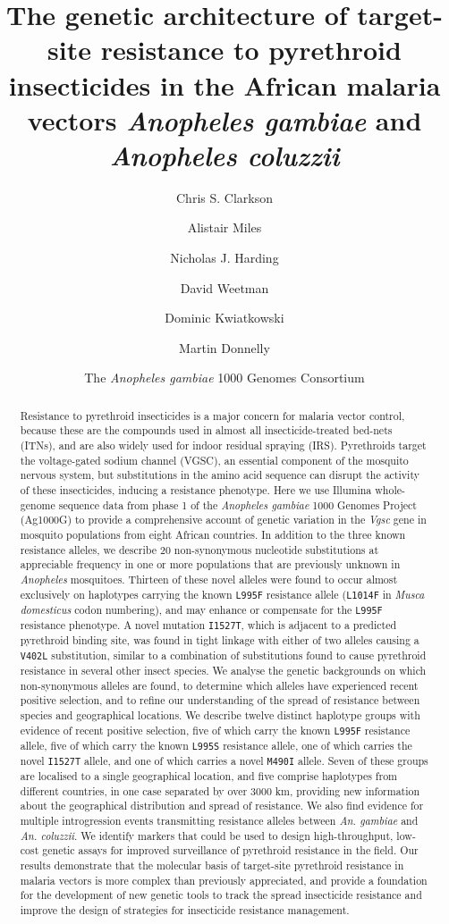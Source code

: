 \documentclass[a4paper,11pt,abstracton,hidelinks]{scrartcl}
\title{
The genetic architecture of target-site resistance to pyrethroid insecticides in the African malaria vectors \emph{Anopheles gambiae} and \emph{Anopheles coluzzii}
}
\author[1,*]{\small Chris S. Clarkson}
\author[2,1,*]{\small Alistair Miles}
\author[2]{\small Nicholas J. Harding}
\author[3]{\small David Weetman}
\author[1,2]{\small Dominic Kwiatkowski}
\author[3,1]{\small Martin Donnelly}
\author[4]{\small The \emph{Anopheles gambiae} 1000 Genomes Consortium}
\affil[1]{\footnotesize Wellcome Sanger Institute, Hinxton, Cambridge CB10 1SA}
\affil[2]{\footnotesize Big Data Institute, University of Oxford, Li Ka Shing Centre for Health Information and Discovery, Old Road Campus, Oxford OX3 7LF}
\affil[3]{\footnotesize Liverpool School of Tropical Medicine, Pembroke Place, Liverpool L3 5QA}
\affil[4]{\footnotesize https://www.malariagen.net/projects/ag1000g\#people}
\affil[*]{\footnotesize These authors contributed equally}
\begin{document}
\maketitle


\begin{abstract}


Resistance to pyrethroid insecticides is a major concern for malaria vector control, because these are the compounds used in almost all insecticide-treated bed-nets (ITNs), and are also widely used for indoor residual spraying (IRS).
%
Pyrethroids target the voltage-gated sodium channel (VGSC), an essential component of the mosquito nervous system, but substitutions in the amino acid sequence can disrupt the activity of these insecticides, inducing a resistance phenotype.
%
Here we use Illumina whole-genome sequence data from phase 1 of the \emph{Anopheles gambiae} 1000 Genomes Project (Ag1000G) to provide a comprehensive account of genetic variation in the \emph{Vgsc} gene in mosquito populations from eight African countries.
%
In addition to the three known resistance alleles, we describe 20 non-synonymous nucleotide substitutions at appreciable frequency in one or more populations that are previously unknown in \textit{Anopheles} mosquitoes.
%
Thirteen of these novel alleles were found to occur almost exclusively on haplotypes carrying the known \texttt{L995F} resistance allele (\texttt{L1014F} in \textit{Musca domesticus} codon numbering), and may enhance or compensate for the \texttt{L995F} resistance phenotype.
%
A novel mutation \texttt{I1527T}, which is adjacent to a predicted pyrethroid binding site, was found in tight linkage with either of two alleles causing a \texttt{V402L} substitution, similar to a combination of substitutions found to cause pyrethroid resistance in several other insect species.
%
We analyse the genetic backgrounds on which non-synonymous alleles are found, to determine which alleles have experienced recent positive selection, and to refine our understanding of the spread of resistance between species and geographical locations.
%
We describe twelve distinct haplotype groups with evidence of recent positive selection, five of which carry the known \texttt{L995F} resistance allele, five of which carry the known \texttt{L995S} resistance allele, one of which carries the novel \texttt{I1527T} allele, and one of which carries a novel \texttt{M490I} allele.
%
Seven of these groups are localised to a single geographical location, and five comprise haplotypes from different countries, in one case separated by over 3000 km, providing new information about the geographical distribution and spread of resistance.
%
We also find evidence for multiple introgression events transmitting resistance alleles between \textit{An. gambiae} and \textit{An. coluzzii}.
%
We identify markers that could be used to design high-throughput, low-cost genetic assays for improved surveillance of pyrethroid resistance in the field.
%
Our results demonstrate that the molecular basis of target-site pyrethroid resistance in malaria vectors is more complex than previously appreciated, and provide a foundation for the development of new genetic tools to track the spread insecticide resistance and improve the design of strategies for insecticide resistance management.


\end{abstract}
\end{document}
